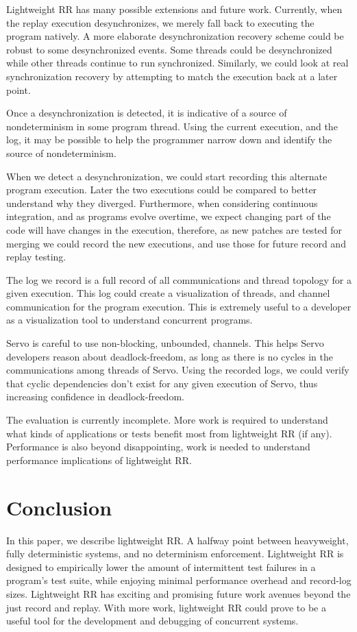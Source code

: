 \documentclass{article}
\begin{document}
Lightweight RR has many possible extensions and future work. Currently, when the replay
execution desynchronizes, we merely fall back to executing the program natively. A more
elaborate desynchronization recovery scheme could be robust to some desynchronized
events. Some threads could be desynchronized while other threads continue to run
synchronized. Similarly, we could look at real synchronization recovery by attempting
to match the execution back at a later point.

Once a desynchronization is detected, it is indicative of a source of nondeterminism
in some program thread. Using the current execution, and the log, it may be possible
to help the programmer narrow down and identify the source of nondeterminism.

When we detect a desynchronization, we could start recording this alternate program
execution. Later the two executions could be compared to better understand why
they diverged. Furthermore, when considering continuous integration, and as programs
evolve overtime, we expect changing part of the code will have changes in the execution,
therefore, as new patches are tested for merging we could record the new executions,
and use those for future record and replay testing.

The log we record is a full record of all communications and thread topology for a
given execution. This log could create a visualization of threads, and channel
communication for the program execution. This is extremely useful to a developer as
a visualization tool to understand concurrent programs.

Servo is careful to use non-blocking, unbounded, channels. This helps Servo developers
reason about deadlock-freedom, as long as there is no cycles in the communications among
threads
of Servo. Using the recorded logs, we could verify that cyclic dependencies don't exist
for any given execution of Servo, thus increasing confidence in deadlock-freedom.

The evaluation is currently incomplete. More work is required to understand what kinds
of applications or tests benefit most from lightweight RR (if any). Performance is also
beyond disappointing, work is needed to understand performance implications of lightweight
RR.

\section{Conclusion}
In this paper, we describe lightweight RR. A halfway point between heavyweight, fully
deterministic systems, and no determinism enforcement. Lightweight RR is designed to
empirically lower the amount of intermittent test failures in a program's test suite,
while enjoying minimal performance overhead and record-log sizes. Lightweight
RR has exciting and promising future work avenues beyond the just record and replay.
With more work, lightweight RR could prove to be a useful tool for the development
and debugging of concurrent systems.
\end{document}
